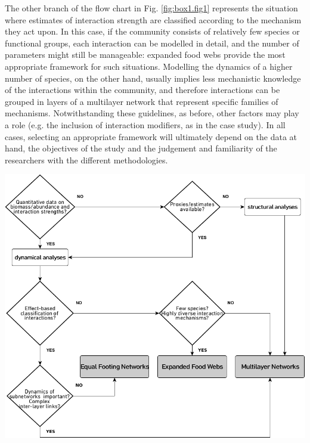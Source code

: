 \begin{small}
\begin{mdframed}
The other branch of the flow chart in Fig. \ref{fig:box1.fig1} represents the situation where estimates of interaction strength are classified according to the mechanism they act upon. In this case, if the community consists of relatively few species or functional groups, each interaction can be modelled in detail, and the number of parameters might still be manageable: expanded food webs provide the most appropriate framework for such situations. Modelling the dynamics of a higher number of species, on the other hand, usually implies less mechanistic knowledge of the interactions within the community, and therefore interactions can be grouped in layers of a multilayer network that represent specific families of mechanisms. Notwithstanding these guidelines, as before, other factors may play a role (e.g. the inclusion of interaction modifiers, as in the case study). In all cases, selecting an appropriate framework will ultimately depend on the data at hand, the objectives of the study and the judgement and familiarity of the researchers with the different methodologies.

\includegraphics[width=.95\textwidth]{./Figures/chapter02/Box_1_Fig_1.png}
\label{fig:box1.fig1}

\end{mdframed}
\end{small}

